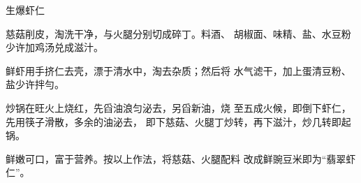 \begin{recipe}{生爆虾仁}

\ingredients


\cooking

\step 慈菇削皮，淘洗干净，与火腿分别切成碎丁。料酒、 胡椒面、味精、盐、水豆粉少许加鸡汤兑成滋汁。

\step 鲜虾用手挤仁去壳，漂于清水中，淘去杂质；然后将 水气滤干，加上蛋清豆粉、盐少许拌勻。

\step 炒锅在旺火上烧红，先舀油浪匀泌去，另舀新油，烧 至五成火候，即倒下虾仁，先用筷子滑散，多余的油泌去， 即下慈菇、火腿丁炒转，再下滋汁，炒几转即起锅。

\notes

鲜嫩可口，富于营养。按以上作法，将慈菇、火腿配料 改成鲜豌豆米即为“翡翠虾仁”。

\end{recipe}

